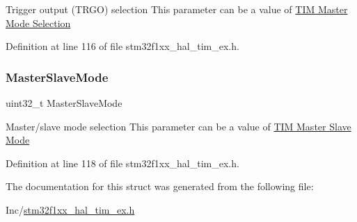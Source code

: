 Trigger output (T\+R\+GO) selection This parameter can be a value of \hyperlink{group___t_i_m___master___mode___selection}{T\+IM Master Mode Selection} 

Definition at line 116 of file stm32f1xx\+\_\+hal\+\_\+tim\+\_\+ex.\+h.

\mbox{\label{struct_t_i_m___master_config_type_def_aa17903ecbee15ce7a6d51de5e9602d3f}} 
\subsubsection{\texorpdfstring{Master\+Slave\+Mode}{MasterSlaveMode}}
{\footnotesize\ttfamily uint32\+\_\+t Master\+Slave\+Mode}

Master/slave mode selection This parameter can be a value of \hyperlink{group___t_i_m___master___slave___mode}{T\+IM Master Slave Mode} 

Definition at line 118 of file stm32f1xx\+\_\+hal\+\_\+tim\+\_\+ex.\+h.



The documentation for this struct was generated from the following file\+:\begin{DoxyCompactItemize}
\item 
Inc/\hyperlink{stm32f1xx__hal__tim__ex_8h}{stm32f1xx\+\_\+hal\+\_\+tim\+\_\+ex.\+h}\end{DoxyCompactItemize}
